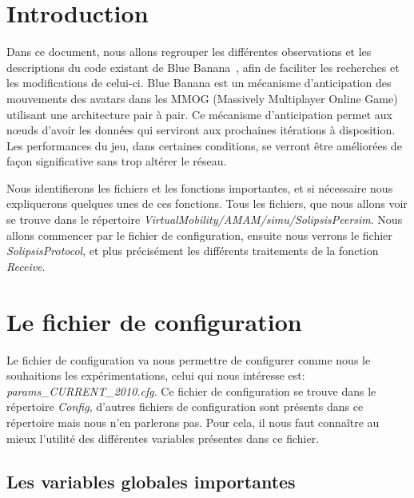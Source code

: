\documentclass[11pt,a4paper]{article}
\begin{document}

\newpage
\tableofcontents
\newpage



\section{Introduction}
\par Dans ce document, nous allons regrouper les différentes observations et les descriptions du code existant de Blue Banana~\cite{191}, afin de faciliter les recherches et les modifications de celui-ci. Blue Banana est un mécanisme d'anticipation des mouvements des avatars dans les MMOG (Massively Multiplayer Online Game) utilisant une architecture pair à pair. Ce mécanisme d'anticipation permet aux nœuds d'avoir les données qui serviront aux prochaines itérations à disposition. Les performances du jeu, dans certaines conditions, se verront être améliorées de façon significative sans trop altérer le réseau.
\par Nous identifierons les fichiers et les fonctions importantes, et si nécessaire nous expliquerons quelques unes de ces fonctions. Tous les fichiers, que nous allons voir se trouve dans le répertoire \textit{VirtualMobility/AMAM/simu/SolipsisPeersim}. Nous allons commencer par le fichier de configuration, ensuite nous verrons le fichier \textit{SolipsisProtocol}, et plus précisément les différents traitements de la fonction \textit{Receive}.

\newpage
\section{Le fichier de configuration}
\par Le fichier de configuration va nous permettre de configurer comme nous le souhaitions les expérimentations, celui qui nous intéresse est: \textit{params\_CURRENT\_2010.cfg}. Ce fichier de configuration se trouve dans le répertoire \textit{Config}, d'autres fichiers de configuration sont présents dans ce répertoire mais nous n'en parlerons pas. Pour cela, il nous faut connaître au mieux l'utilité des différentes variables présentes dans ce fichier.

\subsection{Les variables globales importantes}
\end{document}
